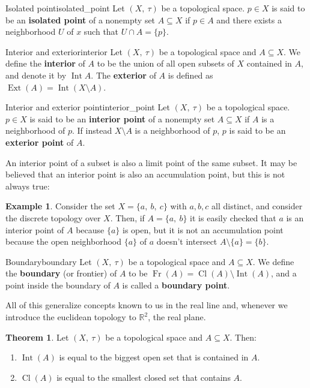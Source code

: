 \documentclass[a4paper]{book}
\theoremstyle{definition}
\newtheorem{theorem}{Theorem}[section]
\theoremstyle{ejemplo}
\newtheorem{example}{Example}[section]
\theoremstyle{demostracion}
\newcommand{\reales}{\mathbb{R}}
\DeclareMathOperator{\interior}{Int}
\DeclareMathOperator{\exterior}{Ext}
\DeclareMathOperator{\closure}{Cl}
\DeclareMathOperator{\boundary}{Fr}
\begin{document}
\begin{define}{Isolated point}{isolated_point}
	Let $(X,\ \tau)$ be a topological space. $p \in X$ is said to be an \textbf{isolated point} of a nonempty set $A \subseteq X$ if $p \in A$ and there exists a neighborhood $U$ of $x$ such that $U \cap A = \{ p\}$.
\end{define}

\begin{define}{Interior and exterior}{interior}
	Let $(X,\ \tau)$ be a topological space and $A \subseteq X$. We define the \textbf{interior} of $A$ to be the union of all open subsets of $X$ contained in $A$, and denote it by $\interior{A}$. The \textbf{exterior} of $A$ is defined as $\exterior(A) = \interior(X \setminus A)$.
\end{define}

\begin{define}{Interior and exterior point}{interior_point}
	Let $(X,\ \tau)$ be a topological space. $p \in X$ is said to be an \textbf{interior point} of a nonempty set $A \subseteq X$ if $A$ is a neighborhood of $p$. If instead $X \setminus A$ is a neighborhood of $p$, $p$ is said to be an \textbf{exterior point} of $A$.
\end{define}

An interior point of a subset is also a limit point of the same subset. It may be believed that an interior point is also an accumulation point, but this is not always true:
\begin{example}
	Consider the set $X = \{ a,\ b,\ c\}$ with $a,b,c$ all distinct, and consider the discrete topology over $X$. Then, if $A = \{a,\ b \}$ it is easily checked that $a$ is an interior point of $A$ because $\{ a\}$ is open, but it is not an accumulation point because the open neighborhood $\{ a\}$ of $a$ doesn't intersect $A \setminus \{ a\} = \{ b\}$.
\end{example}

\begin{define}{Boundary}{boundary}
	Let $(X,\ \tau)$ be a topological space and $A \subseteq X$. We define the \textbf{boundary} (or frontier) of $A$ to be $\boundary(A) = \closure(A) \setminus \interior(A)$, and a point inside the boundary of $A$ is called a \textbf{boundary point}.
\end{define}

All of this generalize concepts known to us in the real line and, whenever we introduce the euclidean topology to $\reales^2$, the real plane.

\begin{theorem}
	Let $(X,\ \tau)$ be a topological space and $A \subseteq X$. Then:
	\begin{enumerate}
		\item
		$\interior(A)$ is equal to the biggest open set that is contained in $A$.
		\item
		$\closure(A)$ is equal to the smallest closed set that contains $A$.
	\end{enumerate}
\end{theorem}
\end{document}
